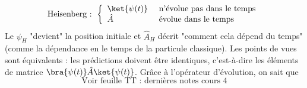 	\begin{equation}
	\text{Heisenberg : }\left\{\begin{array}{ll}
	\ket{\psi(t)} & \text{ n'évolue pas dans le temps}\\
	\hat{A} & \text{ évolue dans le temps}	
	\end{array}\right.
	\end{equation}	
	Le $\psi_H$ "devient" la position initiale et $\hat{A}_H$ décrit "comment cela dépend du temps" 
	(comme la dépendance en le temps de la particule classique). Les points de vues sont équivalents : 
	les prédictions doivent être identiques, c'est-à-dire les éléments de matrice 
	$\bra{\psi(t)}\hat{A}\ket{\psi(t)}$. Grâce à l'opérateur d'évolution, on sait que
	\begin{equation}
	\text{Voir feuille TT : dernières notes cours 4}
	\end{equation}
 

